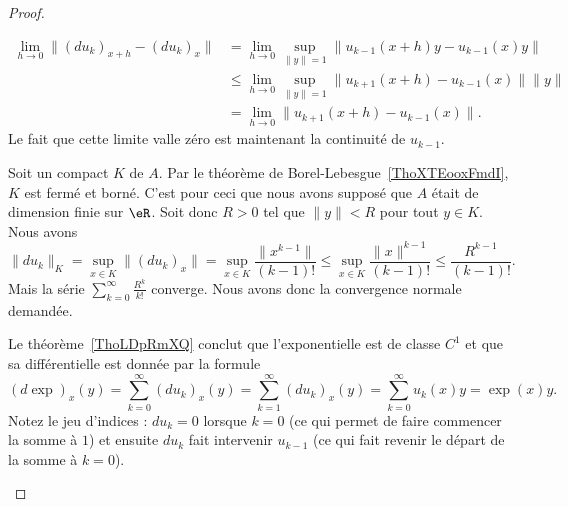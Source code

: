 \begin{proof}
\begin{subproof}
		\begin{subequations}
			\begin{align}
				\lim_{h\to 0} \| (du_k)_{x+h}-(du_k)_x \| & =\lim_{h\to 0} \sup_{\| y \|=1}\| u_{k-1}(x+h)y-u_{k-1}(x)y \|         \\
				                                          & \leq\lim_{h\to 0} \sup_{\| y \|=1}\| u_{k+1}(x+h)-u_{k-1}(x) \|\| y \| \\
				                                          & =\lim_{h\to 0} \| u_{k+1}(x+h)-u_{k-1}(x) \|.
			\end{align}
		\end{subequations}
		Le fait que cette limite valle zéro est maintenant la continuité de \( u_{k-1}\).


		Soit un compact \( K\) de \( A\). Par le théorème de Borel-Lebesgue~\ref{ThoXTEooxFmdI}, \( K\) est fermé et borné. C'est pour ceci que nous avons supposé que \( A\) était de dimension finie sur \( \eR\). Soit donc \( R>0\) tel que \( \| y \|<R\) pour tout \( y\in K\). Nous avons
		\begin{equation}
			\| du_k \|_K=\sup_{x\in K}\| (du_k)_x \|=\sup_{x\in K}\frac{ \| x^{k-1} \| }{ (k-1)! }\leq \sup_{x\in K}\frac{ \| x \|^{k-1} }{ (k-1)! }\leq \frac{ R^{k-1} }{ (k-1)! }.
		\end{equation}
		Mais la série \( \sum_{k=0}^{\infty}\frac{ R^k }{k!}\) converge. Nous avons donc la convergence normale demandée.

		\spitem[Conclusion]

		Le théorème~\ref{ThoLDpRmXQ} conclut que l'exponentielle est de classe \( C^1\) et que sa différentielle est donnée par la formule
		\begin{equation}
			(d\exp)_x(y)=\sum_{k=0}^{\infty}(du_k)_x(y)=\sum_{k=1}^{\infty}(du_k)_x(y)=\sum_{k=0}^{\infty}u_k(x)y=\exp(x)y.
		\end{equation}
		Notez le jeu d'indices : \( du_k=0\) lorsque \( k=0\) (ce qui permet de faire commencer la somme à \( 1\)) et ensuite \( du_k\) fait intervenir \( u_{k-1}\) (ce qui fait revenir le départ de la somme à \( k=0\)).

	\end{subproof}
\end{proof}

